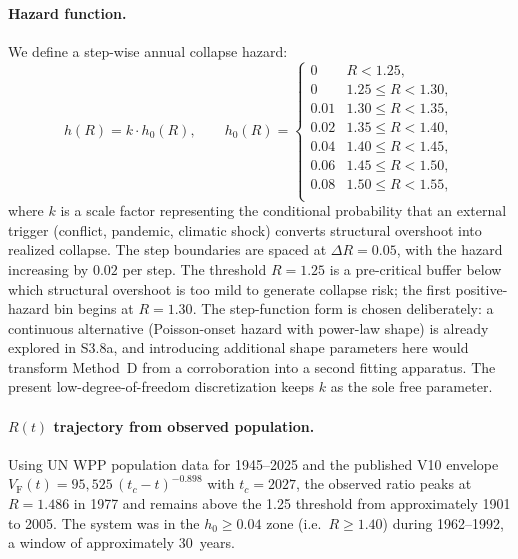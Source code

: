 \documentclass[11pt]{article}
\newcommand{\VF}{V_{\mathrm{F}}}
\begin{document}
\paragraph{Hazard function.}
We define a step-wise annual collapse hazard:
\begin{equation}
h(R) = k \cdot h_0(R),
\qquad
h_0(R) =
\begin{cases}
0       & R < 1.25, \\
0       & 1.25 \le R < 1.30, \\
0.01    & 1.30 \le R < 1.35, \\
0.02    & 1.35 \le R < 1.40, \\
0.04    & 1.40 \le R < 1.45, \\
0.06    & 1.45 \le R < 1.50, \\
0.08    & 1.50 \le R < 1.55, \\
\end{cases}
\label{eq:hazard_step}
\end{equation}
where $k$ is a scale factor representing the conditional probability
that an external trigger (conflict, pandemic, climatic shock) converts
structural overshoot into realized collapse.  The step boundaries are spaced
at $\Delta R = 0.05$, with the hazard increasing by $0.02$ per step.
The threshold $R = 1.25$ is a pre-critical buffer below which structural
overshoot is too mild to generate collapse risk; the first positive-hazard
bin begins at $R = 1.30$.  The step-function form is chosen deliberately:
a continuous alternative (Poisson-onset hazard with power-law shape) is
already explored in S3.8a, and introducing additional shape parameters here
would transform Method~D from a corroboration into a second fitting apparatus.
The present low-degree-of-freedom discretization keeps $k$ as the sole
free parameter.

\paragraph{$R(t)$ trajectory from observed population.}
Using UN WPP population data for 1945--2025 and the published V10 envelope
$\VF(t) = 95{,}525\,(t_c - t)^{-0.898}$ with $t_c = 2027$, the observed
ratio peaks at $R = 1.486$ in 1977 and remains above the 1.25 threshold
from approximately 1901 to 2005.  The system was in the $h_0 \ge 0.04$
zone (i.e.\ $R \ge 1.40$) during 1962--1992, a window of approximately
30~years.
\end{document}
